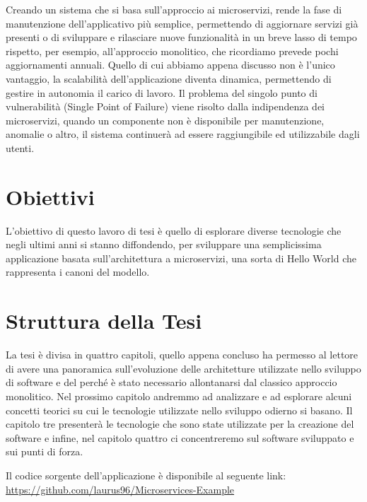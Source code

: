 Creando un sistema che si basa sull'approccio ai microservizi, rende la fase di manutenzione dell'applicativo più semplice, permettendo di aggiornare servizi già presenti o di sviluppare e rilasciare nuove funzionalità in un breve lasso di tempo rispetto, per esempio, all'approccio monolitico, che ricordiamo prevede pochi aggiornamenti annuali. Quello di cui abbiamo appena discusso non è l'unico vantaggio, la scalabilità dell'applicazione diventa dinamica, permettendo di gestire in autonomia il carico di lavoro. Il problema del singolo punto di vulnerabilità (Single Point of Failure) viene risolto dalla indipendenza dei microservizi, quando un componente non è disponibile per manutenzione, anomalie o altro, il sistema continuerà ad essere raggiungibile ed utilizzabile dagli utenti.

\section{Obiettivi}
L'obiettivo di questo lavoro di tesi è quello di esplorare diverse tecnologie che negli ultimi anni si stanno diffondendo, per sviluppare una semplicissima applicazione basata sull'architettura a microservizi, una sorta di Hello World che rappresenta i canoni del modello.

\section{Struttura della Tesi}
La tesi è divisa in quattro capitoli, quello appena concluso ha permesso al lettore di avere una panoramica sull'evoluzione delle architetture utilizzate nello sviluppo di software e del perché è stato necessario allontanarsi dal classico approccio monolitico. Nel prossimo capitolo andremmo ad analizzare e ad esplorare alcuni concetti teorici su cui le tecnologie utilizzate nello sviluppo odierno si basano. Il capitolo tre presenterà le tecnologie che sono state utilizzate per la creazione del software e infine, nel capitolo quattro ci concentreremo sul software sviluppato e sui punti di forza.

Il codice sorgente dell'applicazione è disponibile al seguente link: \url{https://github.com/laurus96/Microservices-Example}